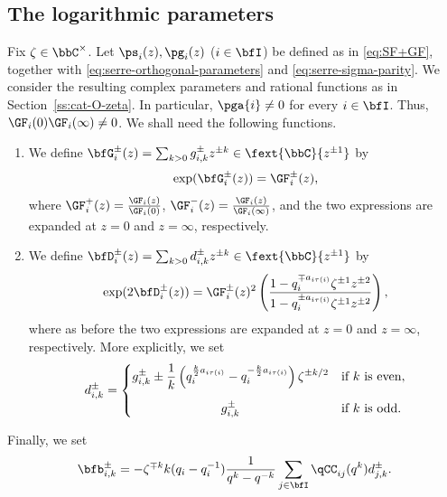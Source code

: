 \documentclass[reqno]{amsart}
\numberwithin{equation}{section}
\begin{document}
\subsection{The logarithmic parameters}\label{ss:bK0-coeff-b}
Fix $\zeta\in\bbC^\times$. Let $\ps_i(z),\pg_i(z)$ ($i\in\bfI$) be 
defined as in \eqref{eq:SF+GF}, together with
\eqref{eq:serre-orthogonal-parameters} and \eqref{eq:serre-sigma-parity}. 
We consider the resulting complex parameters and rational functions as in Section~\ref{ss:cat-O-zeta}.
In particular, $\pga{i}\neq0$ for every $i\in\bfI$. Thus,
$\GF_i(0)\GF_i(\infty)\neq0$. We shall need the following functions.
\begin{enumerate}[leftmargin=2em]\itemsep0.25cm
\item We define
$\bfG_{i}^\pm(z)=\sum_{k>0}g_{i,k}^{\pm}z^{\pm k}\in\fext{\bbC}{z^{\pm1}}$ by
\begin{equation}\label{eq:log-GF-pm}
\exp(\bfG_i^\pm(z))
=\GF^\pm_i(z),
\end{equation}
where $\GF^+_i(z)=\frac{\GF_i(z)}{\GF_i(0)}$, $\GF^-_i(z)=\frac{\GF_i(z)}{\GF_i(\infty)}$, and  the two expressions are expanded at $z=0$ and $z=\infty$,
respectively. 
\item We define $\bfD_i^\pm(z)=\sum_{k>0}d_{i,k}^\pm z^{\pm k}\in\fext{\bbC}{z^{\pm1}}$ by
\begin{equation}\label{eq:def-d-exp}
\exp(2\bfD_i^\pm(z))=\GF_i^\pm(z)^2\left(
\frac{1-q_i^{\mp a_{i\tau(i)}}\zeta^{\pm 1} z^{\pm 2}}
{1-q_i^{\pm a_{i\tau(i)}}\zeta^{\pm 1} z^{\pm 2}}
\right),
\end{equation}
where as before the two expressions are expanded at $z=0$ and $z=\infty$,
respectively. More explicitly, we set
\begin{equation}\label{eq:def-d-bK}
d_{i,k}^{\pm}
=
\begin{cases}
\displaystyle
g_{i,k}^{\pm}\pm\frac{1}{k}
\left(
q_i^{\frac{k}{2}a_{i\tau(i)}}
-q_i^{-\frac{k}{2}a_{i\tau(i)}}
\right)
\zeta^{\pm k/2}& \mbox{if $k$ is even},\\[1.1em]
\hfill g_{i,k}^{\pm}\hfill & \mbox{if $k$ is odd}.
\end{cases}
\end{equation}
\end{enumerate}
Finally, we set
\begin{equation}\label{eq:bK0-coefficients}
\bfb_{i,k}^{\pm}
=
-\zeta^{\mp k}
k(q_i-q_i^{-1})
\frac{1}{q^k-q^{-k}}
\sum_{j\in\bfI}
\qCC_{ij}(q^k)d_{j,k}^{\pm}.
\end{equation}
\end{document}

